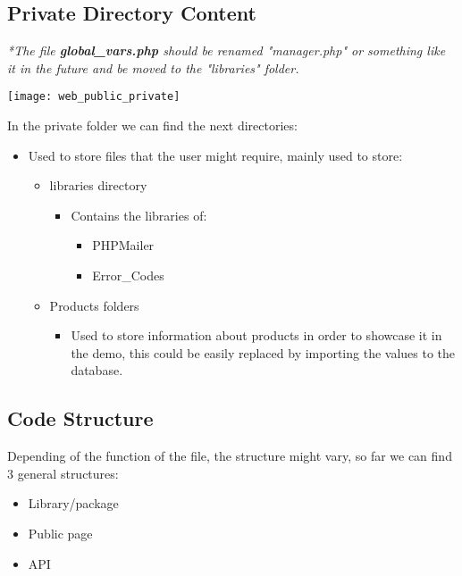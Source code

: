 \subsection{Private Directory Content}\label{subsec:private-directory-content}
\begin{flushleft}
    \textit{*The file \textbf{global\_vars.php} should be renamed "manager.php" or something like it in the future and
    be moved to the "libraries" folder.}
\end{flushleft}
\begin{center}
    \texttt{[image: web\_public\_private]}
\end{center}
\begin{flushleft}
    In the private folder we can find the next directories:
\end{flushleft}
\begin{itemize}
    \item Used to store files that the user might require, mainly used to store:
    \begin{itemize}
        \item libraries directory
        \begin{itemize}
            \item Contains the libraries of:
            \begin{itemize}
                \item PHPMailer
                \item Error\_Codes
            \end{itemize}
        \end{itemize}
        \item Products folders
        \begin{itemize}
            \item Used to store information about products in order to showcase it in the demo, this could be easily
            replaced by importing the values to the database.
        \end{itemize}
    \end{itemize}
\end{itemize}

\subsection{Code Structure}\label{subsec:code-structure}

\begin{flushleft}
    Depending of the function of the file, the structure might vary, so far we can find 3 general structures:
    \begin{itemize}
        \item Library/package
        \item Public page
        \item API
    \end{itemize}
\end{flushleft}
\newpage
